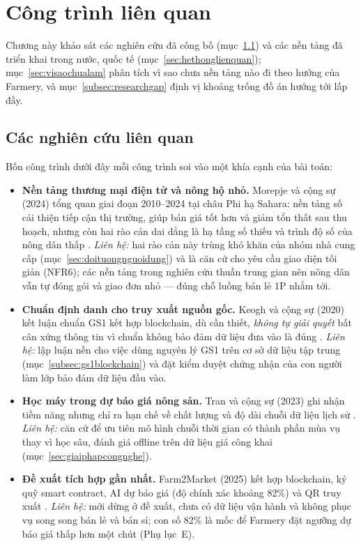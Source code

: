 \chapter{Công trình liên quan}
\label{chap:lienquan}

Chương này khảo sát các nghiên cứu đã công bố (mục~\ref{sec:nghiencuulienquan}) và các nền tảng đã triển khai trong nước, quốc tế (mục~\ref{sec:hethonglienquan}); mục~\ref{sec:visaochualam} phân tích vì sao chưa nền tảng nào đi theo hướng của Farmery, và mục~\ref{subsec:researchgap} định vị khoảng trống đồ án hướng tới lấp đầy.

\section{Các nghiên cứu liên quan}
\label{sec:nghiencuulienquan}

Bốn công trình dưới đây mỗi công trình soi vào một khía cạnh của bài toán:
\begin{itemize}
    \item \textbf{Nền tảng thương mại điện tử và nông hộ nhỏ.} Morepje và cộng sự (2024) tổng quan giai đoạn 2010--2024 tại châu Phi hạ Sahara: nền tảng số cải thiện tiếp cận thị trường, giúp bán giá tốt hơn và giảm tổn thất sau thu hoạch, nhưng còn hai rào cản dai dẳng là hạ tầng số thiếu và trình độ số của nông dân thấp \parencite{morepje2024ecommerce}. \emph{Liên hệ:} hai rào cản này trùng khó khăn của nhóm nhà cung cấp (mục~\ref{sec:doituongnguoidung}) và là căn cứ cho yêu cầu giao diện tối giản (NFR6); các nền tảng trong nghiên cứu thuần trung gian nên nông dân vẫn tự đóng gói và giao đơn nhỏ --- đúng chỗ luồng bán lẻ 1P nhắm tới.
    \item \textbf{Chuẩn định danh cho truy xuất nguồn gốc.} Keogh và cộng sự (2020) kết luận chuẩn GS1 kết hợp blockchain, dù cần thiết, \emph{không tự giải quyết} bất cân xứng thông tin vì chuẩn không bảo đảm dữ liệu đưa vào là đúng \parencite{keogh2020blockchain}. \emph{Liên hệ:} lập luận nền cho việc dùng nguyên lý GS1 trên cơ sở dữ liệu tập trung (mục~\ref{subsec:gs1blockchain}) và đặt kiểm duyệt chứng nhận của con người làm lớp bảo đảm dữ liệu đầu vào.
    \item \textbf{Học máy trong dự báo giá nông sản.} Tran và cộng sự (2023) ghi nhận tiềm năng nhưng chỉ ra hạn chế về chất lượng và độ dài chuỗi dữ liệu lịch sử \parencite{tran2023pricepredict}. \emph{Liên hệ:} căn cứ để ưu tiên mô hình chuỗi thời gian có thành phần mùa vụ thay vì học sâu, đánh giá offline trên dữ liệu giá công khai (mục~\ref{sec:giaiphapcongnghe}).
    \item \textbf{Đề xuất tích hợp gần nhất.} Farm2Market (2025) kết hợp blockchain, ký quỹ smart contract, AI dự báo giá (độ chính xác khoảng 82\%) và QR truy xuất \parencite{farm2market_2025}. \emph{Liên hệ:} mới dừng ở đề xuất, chưa có dữ liệu vận hành và không phục vụ song song bán lẻ và bán sỉ; con số 82\% là mốc để Farmery đặt ngưỡng dự báo giá thấp hơn một chút (Phụ lục~E).
\end{itemize}


